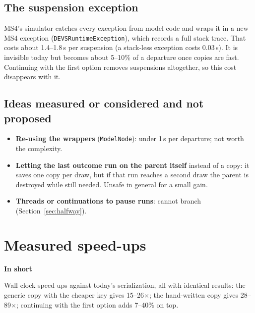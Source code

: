 \documentclass[11pt]{article}
\newcommand{\code}[1]{\texttt{#1}}
\newcommand{\shadedbox}[3]{\par\smallskip\noindent\colorbox{#1}{\parbox{\dimexpr\linewidth-2\fboxsep}{\textbf{#2}\par #3}}\par\smallskip}
\newcommand{\takeaway}[1]{\shadedbox{okbg}{In short}{#1}}
\newcommand{\us}{\,\textmu s}
\begin{document}
\subsection{The suspension exception}
MS4's simulator catches every exception from model code and wraps it in a new MS4 exception
(\code{DEVSRuntimeException}), which records a full stack trace. That costs about 1.4--1.8\us{} per suspension (a stack-less exception costs 0.03\us). It is
invisible today but becomes about 5--10\% of a departure once copies are fast. Continuing with the first option
removes suspensions altogether, so this cost disappears with it.

\subsection{Ideas measured or considered and not proposed}
\begin{itemize}
\item \textbf{Re-using the wrappers} (\code{ModelNode}): under 1\us{} per departure; not worth the complexity.
\item \textbf{Letting the last outcome run on the parent itself} instead of a copy: it saves one copy per draw, but
  if that run reaches a second draw the parent is destroyed while still needed. Unsafe in general for a small gain.
\item \textbf{Threads or continuations to pause runs}: cannot branch (Section~\ref{sec:halfway}).
\end{itemize}

\section{Measured speed-ups}\label{sec:results}

\takeaway{Wall-clock speed-ups against today's serialization, all with identical results: the generic copy with the
cheaper key gives 15--26$\times$; the hand-written copy gives 28--89$\times$; continuing with the first option adds
7--40\% on top.}
\end{document}
